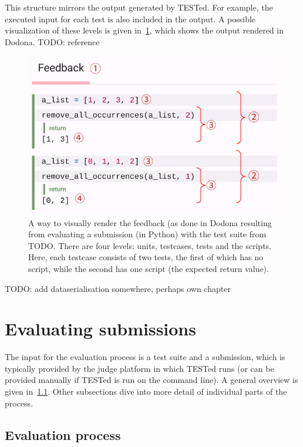 \documentclass[../main]{subfiles}
\begin{document}
This structure mirrors the output generated by TESTed.
For example, the executed input for each test is also included in the output.
A possible visualization of these levels is given in~\cref{fig:dodona}, which shows the output rendered in Dodona.
TODO: reference

\begin{figure}
    \centering
    \includegraphics[scale=0.4]{dodona-rendering}
    \caption{A way to visually render the feedback (as done in Dodona resulting from evaluating a submission (in Python) with the test suite from TODO. There are four levels:  units,  testcases,  tests and  the scripts. Here, each testcase consists of two tests, the first of which has no script, while the second has one script (the expected return value).}
    \label{fig:dodona}
\end{figure}

TODO: add dataserialisation somewhere, perhaps own chapter

\section{Evaluating submissions}\label{sec:evaluating-submissions}

The input for the evaluation process is a test suite and a submission, which is typically provided by the judge platform in which TESTed runs (or can be provided manually if TESTed is run on the command line).
A general overview is given in~\cref{subsec:evaluation-process}.
Other subsections dive into more detail of individual parts of the process.

\subsection{Evaluation process}\label{subsec:evaluation-process}
\end{document}
